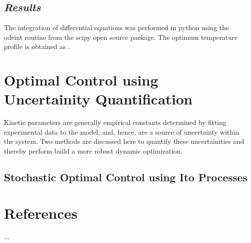 \documentclass[3p,times]{elsarticle}
\begin{document}
\subsection{\textit{Results}}

The integration of differential equations was performed in python using the odeint routine from the scipy open source package. The optimum temperature profile is obtained as .


\section{Optimal Control using Uncertainity Quantification}
Kinetic parameters are generally empirical constants determined by fitting experimental data to the model, and, hence, are a source of uncertainty within the system. Two methods are discussed here to quantify these uncertainities and thereby perform build a more robust dynamic optimization.

\subsection{Stochastic Optimal Control using Ito Processes}







%
%

\newpage
\section{References}
\begin{thebibliography}{1}

 ...
	

\end{thebibliography}
\end{document}
